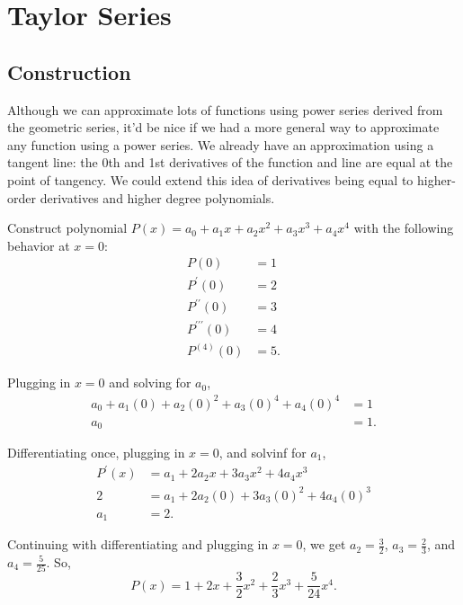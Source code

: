 \section{Taylor Series}
\subsection{Construction}
Although we can approximate lots of functions using power series derived from the geometric series, it'd be nice if we had a more general way to approximate any function using a power series.
We already have an approximation using a tangent line: the 0th and 1st derivatives of the function and line are equal at the point of tangency.
We could extend this idea of derivatives being equal to higher-order derivatives and higher degree polynomials.

\begin{example}
	Construct  polynomial $P(x)=a_0+a_1x + a_2x^2 + a_3x^3 + a_4x^4$ with the following behavior at $x=0$:
	\begin{align*}
		P(0) &= 1 \\
		P^\prime(0) &= 2 \\
		P^{\prime\prime}(0) &= 3 \\
		P^{\prime\prime\prime}(0) &= 4 \\
		P^{(4)}(0) &= 5.
	\end{align*}
\end{example}
\begin{answer}
	Plugging in $x=0$ and solving for $a_0$,
	\begin{align*}
		a_0 + a_1(0) + a_2(0)^2 + a_3(0)^4 + a_4(0)^4 &= 1 \\
		a_0 &= 1.
	\end{align*}
	
	Differentiating once, plugging in $x=0$, and solvinf for $a_1$,
	\begin{align*}
		P^\prime(x) &= a_1 + 2a_2x + 3a_3x^2 + 4a_4x^3 \\
		2 &= a_1 + 2a_2(0) + 3a_3(0)^2 + 4a_4(0)^3 \\
		a_1 &= 2.
	\end{align*}
	
	Continuing with differentiating and plugging in $x=0$, we get $a_2 = \frac{3}{2}$, $a_3 = \frac{2}{3}$, and $a_4 = \frac{5}{25}$.
	So,
	\begin{equation*}
		P(x) = 1 + 2x + \frac{3}{2}x^2 + \frac{2}{3}x^3 + \frac{5}{24}x^4.
	\end{equation*}
\end{answer}

